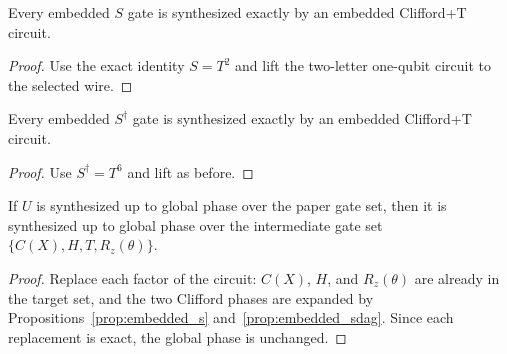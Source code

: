 \begin{proposition}
  \label{prop:embedded_s}
  \leanok
  Every embedded $S$ gate is synthesized exactly by an embedded Clifford+T
  circuit.
\end{proposition}

\begin{proof}
  \leanok
  Use the exact identity $S = T^2$ and lift the two-letter one-qubit circuit to
  the selected wire.
\end{proof}

\begin{proposition}
  \label{prop:embedded_sdag}
  \leanok
  Every embedded $S^\dagger$ gate is synthesized exactly by an embedded
  Clifford+T circuit.
\end{proposition}

\begin{proof}
  \leanok
  Use $S^\dagger = T^6$ and lift as before.
\end{proof}

\begin{theorem}
  \label{thm:clifford_rz_to_t_rz}
  \leanok
  If $U$ is synthesized up to global phase over the paper gate set, then it is
  synthesized up to global phase over the intermediate gate set
  $\{C(X), H, T, R_z(\theta)\}$.
\end{theorem}

\begin{proof}
  \leanok
  Replace each factor of the circuit: $C(X)$, $H$, and $R_z(\theta)$ are
  already in the target set, and the two Clifford phases are expanded by
  Propositions~\ref{prop:embedded_s} and~\ref{prop:embedded_sdag}.  Since each
  replacement is exact, the global phase is unchanged.
\end{proof}
